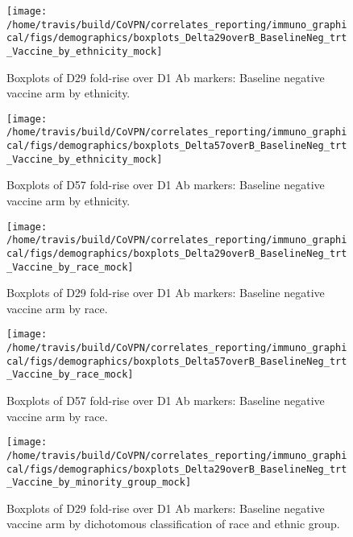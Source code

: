 \documentclass[]{book}
\theoremstyle{definition}
\theoremstyle{definition}
\theoremstyle{definition}
\newcommand{\1}{\mathbbm{1}}
\begin{document}
\begin{figure}[H]

{\centering \texttt{[image: /home/travis/build/CoVPN/correlates\_reporting/immuno\_graphical/figs/demographics/boxplots\_Delta29overB\_BaselineNeg\_trt\_Vaccine\_by\_ethnicity\_mock]} 

}

\caption{Boxplots of D29 fold-rise over D1 Ab markers: Baseline negative vaccine arm by ethnicity.}\label{fig:unnamed-chunk-150}
\end{figure}

\begin{figure}[H]

{\centering \texttt{[image: /home/travis/build/CoVPN/correlates\_reporting/immuno\_graphical/figs/demographics/boxplots\_Delta57overB\_BaselineNeg\_trt\_Vaccine\_by\_ethnicity\_mock]} 

}

\caption{Boxplots of D57 fold-rise over D1 Ab markers: Baseline negative vaccine arm by ethnicity.}\label{fig:unnamed-chunk-151}
\end{figure}

\begin{figure}[H]

{\centering \texttt{[image: /home/travis/build/CoVPN/correlates\_reporting/immuno\_graphical/figs/demographics/boxplots\_Delta29overB\_BaselineNeg\_trt\_Vaccine\_by\_race\_mock]} 

}

\caption{Boxplots of D29 fold-rise over D1 Ab markers: Baseline negative vaccine arm by race.}\label{fig:unnamed-chunk-154}
\end{figure}

\begin{figure}[H]

{\centering \texttt{[image: /home/travis/build/CoVPN/correlates\_reporting/immuno\_graphical/figs/demographics/boxplots\_Delta57overB\_BaselineNeg\_trt\_Vaccine\_by\_race\_mock]} 

}

\caption{Boxplots of D57 fold-rise over D1 Ab markers: Baseline negative vaccine arm by race.}\label{fig:unnamed-chunk-155}
\end{figure}

\begin{figure}[H]

{\centering \texttt{[image: /home/travis/build/CoVPN/correlates\_reporting/immuno\_graphical/figs/demographics/boxplots\_Delta29overB\_BaselineNeg\_trt\_Vaccine\_by\_minority\_group\_mock]} 

}

\caption{Boxplots of D29 fold-rise over D1 Ab markers: Baseline negative vaccine arm by dichotomous classification of race and ethnic group.}\label{fig:unnamed-chunk-158}
\end{figure}
\end{document}
